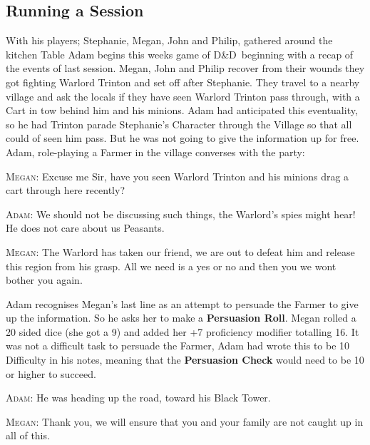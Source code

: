 \documentclass[review]{cmpreport}
\newcommand{\dnd}{D\&D}
\begin{document}
	\subsection{Running a Session} \label{DnDSeshExample}
	With his players; Stephanie, Megan, John and Philip, gathered around the kitchen Table Adam begins this weeks game of \dnd \ beginning with a recap of the events of last session. Megan, John and Philip recover from their wounds they got fighting Warlord Trinton and set off after Stephanie. They travel to a nearby village and ask the locals if they have seen Warlord Trinton pass through, with a Cart in tow behind him and his minions. Adam had anticipated this eventuality, so he had Trinton parade Stephanie's Character through the Village so that all could of seen him pass. But he was not going to give the information up for free. Adam, role-playing a Farmer in the village converses with the party:
	
	\textsc{Megan}: Excuse me Sir, have you seen Warlord Trinton and his minions drag a cart through here recently?
	
	\textsc{Adam}: We should not be discussing such things, the Warlord's spies might hear! He does not care about us Peasants.
	
	\textsc{Megan}: The Warlord has taken our friend, we are out to defeat him and release this region from his grasp. All we need is a yes or no and then you we wont bother you again.
	
	Adam recognises Megan's last line as an attempt to persuade the Farmer to give up the information. So he asks her to make a \textbf{Persuasion Roll}. Megan rolled a 20 sided dice (she got a 9) and added her +7 proficiency modifier totalling 16. It was not a difficult task to persuade the Farmer, Adam had wrote this to be 10 Difficulty in his notes, meaning that the \textbf{Persuasion Check} would need to be 10 or higher to succeed.
	
	\textsc{Adam}: He was heading up the road, toward his Black Tower. 
	
	\textsc{Megan}: Thank you, we will ensure that you and your family are not caught up in all of this.
	
\end{document}
